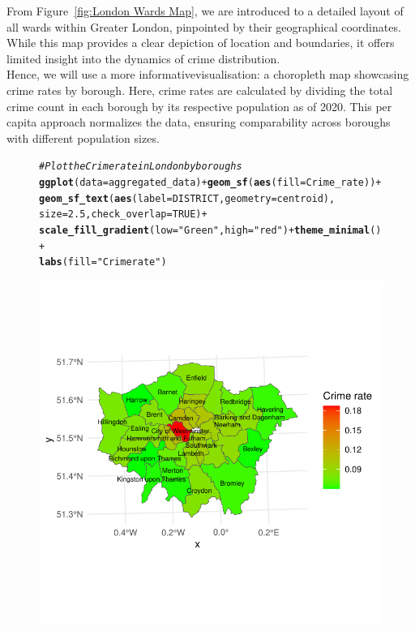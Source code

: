 \documentclass{article}\usepackage[]{graphicx}\usepackage[]{xcolor}
\makeatletter
\def\maxwidth{ %
  \ifdim\Gin@nat@width>\linewidth
    \linewidth
  \else
    \Gin@nat@width
  \fi
}
\newcommand{\hlnum}[1]{\textcolor[rgb]{0.686,0.059,0.569}{#1}}%
\newcommand{\hlstr}[1]{\textcolor[rgb]{0.192,0.494,0.8}{#1}}%
\newcommand{\hlcom}[1]{\textcolor[rgb]{0.678,0.584,0.686}{\textit{#1}}}%
\newcommand{\hlopt}[1]{\textcolor[rgb]{0,0,0}{#1}}%
\newcommand{\hlstd}[1]{\textcolor[rgb]{0.345,0.345,0.345}{#1}}%
\newcommand{\hlkwc}[1]{\textcolor[rgb]{0.333,0.667,0.333}{#1}}%
\newcommand{\hlkwd}[1]{\textcolor[rgb]{0.737,0.353,0.396}{\textbf{#1}}}%
\newenvironment{kframe}{%
 \def\at@end@of@kframe{}%
 \ifinner\ifhmode%
  \def\at@end@of@kframe{\end{minipage}}%
  \begin{minipage}{\columnwidth}%
 \fi\fi%
 \def\FrameCommand##1{\hskip\@totalleftmargin \hskip-\fboxsep
 \colorbox{shadecolor}{##1}\hskip-\fboxsep
     \hskip-\linewidth \hskip-\@totalleftmargin \hskip\columnwidth}%
 \MakeFramed {\advance\hsize-\width
   \@totalleftmargin\z@ \linewidth\hsize
   \@setminipage}}%
 {\par\unskip\endMakeFramed%
 \at@end@of@kframe}
\newenvironment{knitrout}{}{} %
\makeatother
\begin{document}
\noindent
From Figure~\ref{fig:London Wards Map}, we are introduced to a detailed layout of all wards within Greater London, pinpointed by their geographical coordinates. While this map provides a clear depiction of location and boundaries, it offers limited insight into the dynamics of crime distribution.\\

\noindent
Hence, we will use a more informativevisualisation: a choropleth map showcasing crime rates by borough. Here, crime rates are calculated by dividing the total crime count in each borough by its respective population as of 2020. This per capita approach normalizes the data, ensuring comparability across boroughs with different population sizes.

\begin{figure}[H]
\begin{knitrout}\scriptsize
{}\color{fgcolor}\begin{kframe}
\begin{alltt}
\hlcom{# Plot the Crime rate in London by boroughs}
\hlkwd{ggplot}\hlstd{(}\hlkwc{data}\hlstd{=aggregated_data)} \hlopt{+} \hlkwd{geom_sf}\hlstd{(}\hlkwd{aes}\hlstd{(}\hlkwc{fill}\hlstd{=Crime_rate))} \hlopt{+}
  \hlkwd{geom_sf_text}\hlstd{(}\hlkwd{aes}\hlstd{(}\hlkwc{label} \hlstd{= DISTRICT,} \hlkwc{geometry} \hlstd{= centroid),}
               \hlkwc{size} \hlstd{=} \hlnum{2.5}\hlstd{,} \hlkwc{check_overlap} \hlstd{=} \hlnum{TRUE}\hlstd{)} \hlopt{+}
  \hlkwd{scale_fill_gradient}\hlstd{(}\hlkwc{low}\hlstd{=}\hlstr{"Green"}\hlstd{,} \hlkwc{high}\hlstd{=}\hlstr{"red"}\hlstd{)} \hlopt{+} \hlkwd{theme_minimal}\hlstd{()} \hlopt{+}
  \hlkwd{labs}\hlstd{(}\hlkwc{fill}\hlstd{=}\hlstr{"Crime rate"}\hlstd{)}
\end{alltt}
\end{kframe}

{\centering \includegraphics[width=\maxwidth]{figure/beamer-unnamed-chunk-8-1} 

}
\end{knitrout}
\end{figure}
\end{document}
